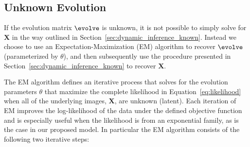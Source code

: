 \subsection{Unknown Evolution}
\label{sec:dynamic_inference_unknown}




If the evolution matrix $\evolve$ is unknown, it is not possible to simply solve for $\bm{X}$ in the way outlined in Section~\ref{sec:dynamic_inference_known}. 
Instead we choose to use an Expectation-Maximization (EM) algorithm to recover $\evolve$ (parameterized by $\theta$), and then subsequently use the procedure presented in Section~\ref{sec:dynamic_inference_known} to recover $\bm{X}$. 

The EM algorithm defines an iterative process that
solves for 
the evolution parameters $\theta$ that maximize the complete likelihood in Equation~\ref{eq:likelihood} when all of the underlying images, $\bm{X}$, are unknown (latent). 
Each iteration of EM improves the log-likelihood of the data under the defined objective function and is especially useful when the likelihood is from an exponential family, as is the case in our proposed model. In particular the EM algorithm consists of the following two iterative steps:


